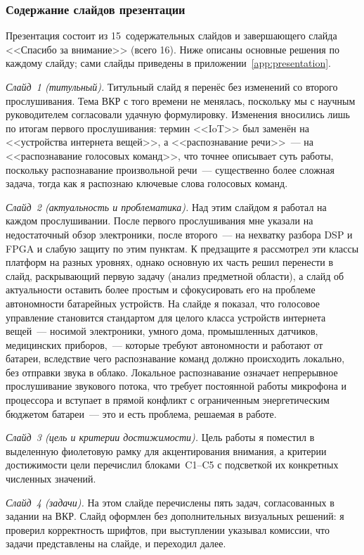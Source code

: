 \subsubsection{Содержание слайдов презентации}

Презентация состоит из 15~содержательных слайдов и завершающего слайда
<<Спасибо за внимание>> (всего 16). Ниже описаны основные решения по
каждому слайду; сами слайды приведены в
приложении~\ref{app:presentation}.

\textit{Слайд~1 (титульный).} Титульный слайд я перенёс без изменений со
второго прослушивания. Тема ВКР с того времени не менялась, поскольку
мы с научным руководителем согласовали удачную формулировку. Изменения
вносились лишь по итогам первого прослушивания: термин <<IoT>> был
заменён на <<устройства интернета вещей>>, а <<распознавание речи>>~---
на <<распознавание голосовых команд>>, что точнее описывает суть работы,
поскольку распознавание произвольной речи~--- существенно более сложная
задача, тогда как я распознаю ключевые слова голосовых команд.

\textit{Слайд~2 (актуальность и проблематика).} Над этим слайдом я
работал на каждом прослушивании. После первого прослушивания мне
указали на недостаточный обзор электроники, после второго~--- на нехватку
разбора DSP и FPGA и слабую защиту по этим пунктам. К предзащите я
рассмотрел эти классы платформ на разных уровнях, однако основную их
часть решил перенести в слайд, раскрывающий первую задачу (анализ
предметной области), а слайд об актуальности оставить более простым и
сфокусировать его на проблеме автономности батарейных устройств. На
слайде я показал, что голосовое управление становится стандартом для
целого класса устройств интернета вещей~--- носимой электроники, умного
дома, промышленных датчиков, медицинских приборов,~--- которые требуют
автономности и работают от батареи, вследствие чего распознавание команд
должно происходить локально, без отправки звука в облако. Локальное
распознавание означает непрерывное прослушивание звукового потока, что
требует постоянной работы микрофона и процессора и вступает в прямой
конфликт с ограниченным энергетическим бюджетом батареи~--- это и есть
проблема, решаемая в работе.

\textit{Слайд~3 (цель и критерии достижимости).} Цель работы я поместил
в выделенную фиолетовую рамку для акцентирования внимания, а критерии
достижимости цели перечислил блоками~C1--C5 с подсветкой их конкретных
численных значений.

\textit{Слайд~4 (задачи).} На этом слайде перечислены пять задач,
согласованных в задании на ВКР. Слайд оформлен без дополнительных
визуальных решений: я проверил корректность шрифтов, при выступлении
указывал комиссии, что задачи представлены на слайде, и переходил далее.

